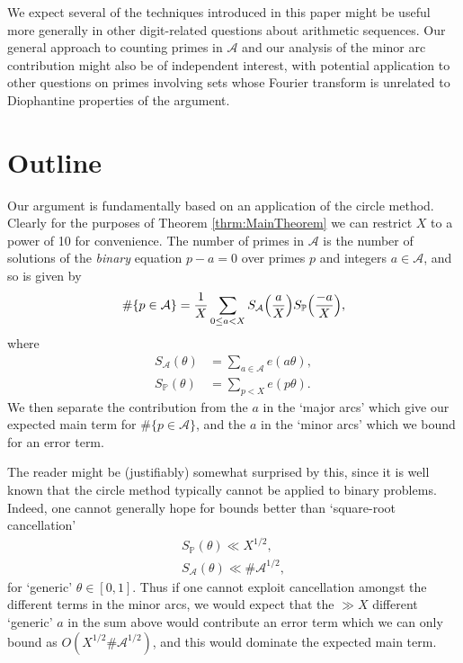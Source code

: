 \documentclass[10pt]{amsart}
\theoremstyle{plain}
\numberwithin{sblmm}{thrm}
\numberwithin{equation}{section}
\begin{document}
We expect several of the techniques introduced in this paper might be useful more generally in other digit-related questions about arithmetic sequences. Our general approach to counting primes in $\mathcal{A}$ and our analysis of the minor arc contribution might also be of independent interest, with potential application to other questions on primes involving sets whose Fourier transform is unrelated to Diophantine properties of the argument.
%
%
%
%
%
%
%
%
\section{Outline}\label{sec:Outline}
%
%
%
Our argument is fundamentally based on an application of the circle method. Clearly for the purposes of Theorem \ref{thrm:MainTheorem} we can restrict $X$ to a power of 10 for convenience. The number of primes in $\mathcal{A}$ is the number of solutions of the \textit{binary} equation $p-a=0$ over primes $p$ and integers $a\in\mathcal{A}$, and so is given by
\[
\#\{p\in\mathcal{A}\}=\frac{1}{X}\sum_{0\le a<X}S_{\mathcal{A}}\Bigl(\frac{a}{X}\Bigr)S_{\mathbb{P}}\Bigl(\frac{-a}{X}\Bigr),
\]
where
%
\begin{align*}
S_{\mathcal{A}}(\theta)&=\sum_{a\in\mathcal{A}}e(a\theta),\\
S_{\mathbb{P}}(\theta)&=\sum_{p<X}e(p\theta).
\end{align*}
%
We then separate the contribution from the $a$ in the `major arcs' which give our expected main term for $\#\{p\in\mathcal{A}\}$, and the $a$ in the `minor arcs' which we bound for an error term. 

The reader might be (justifiably) somewhat surprised by this, since it is well known that the circle method typically cannot be applied to binary problems. Indeed, one cannot generally hope for bounds better than `square-root cancellation'
%
\begin{align*}
S_{\mathbb{P}}(\theta)\ll X^{1/2},\\
S_{\mathcal{A}}(\theta)\ll \#\mathcal{A}^{1/2},
\end{align*}
%
for `generic' $\theta\in[0,1]$. Thus if one cannot exploit cancellation amongst the different terms in the minor arcs, we would expect that the $\gg X$ different `generic' $a$ in the sum above would contribute an error term which we can only bound as $O(X^{1/2}\#\mathcal{A}^{1/2})$, and this would dominate the expected main term.
\end{document}
